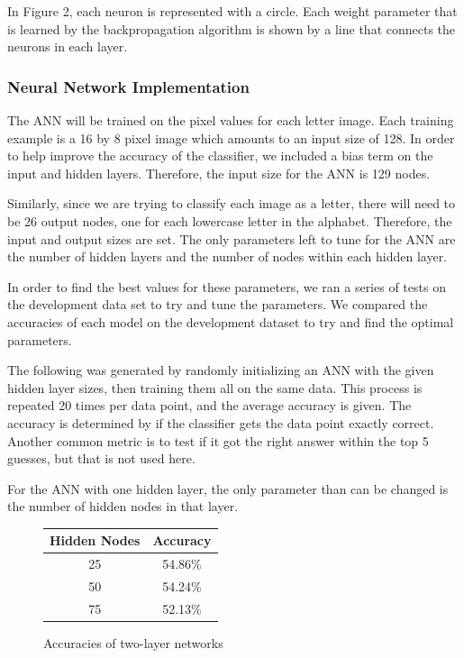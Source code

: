 \documentclass[11pt,a4paper,twocolumn]{article}
\begin{document}
In Figure 2, each neuron is represented with a circle. Each weight parameter that is learned by the
backpropagation algorithm is shown by a line that connects the neurons in each layer.

\subsubsection*{Neural Network Implementation}

The ANN will be trained on the pixel values for each letter image. Each training example is a 16 by
8 pixel image which amounts to an input size of 128. In order to help improve the accuracy of the
classifier, we included a bias term on the input and hidden layers. Therefore, the input size for
the ANN is 129 nodes.

Similarly, since we are trying to classify each image as a letter, there will need to be 26 output
nodes, one for each lowercase letter in the alphabet. Therefore, the input and output sizes are set.
The only parameters left to tune for the ANN are the number of hidden layers and the number of nodes
within each hidden layer.

In order to find the best values for these parameters, we ran a series of tests on the development
data set to try and tune the parameters. We compared the accuracies of each model on the development
dataset to try and find the optimal parameters.

The following was generated by randomly initializing an ANN with the given hidden layer sizes, then
training them all on the same data. This process is repeated 20 times per data point, and the
average accuracy is given. The accuracy is determined by if the classifier gets the data point
exactly correct. Another common metric is to test if it got the right answer within the top 5
guesses, but that is not used here.

For the ANN with one hidden layer, the only parameter than can be changed is the number of hidden nodes in that layer.

\begin{figure}[h]
    \caption{Accuracies of two-layer networks}
    \centering
    \begin{tabular}{|c|c|}
        \hline 
        Hidden Nodes & Accuracy \\ 
        \hline 
        25 & 54.86\% \\ 
        \hline 
        50 & 54.24\% \\ 
        \hline 
        75 & 52.13\% \\ 
        \hline 
    \end{tabular} 
\end{figure}
\end{document}

